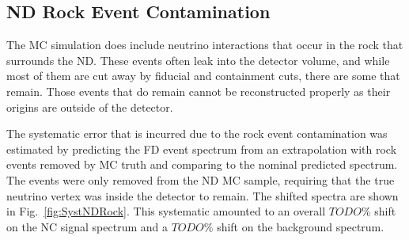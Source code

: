\subsection{ND Rock Event Contamination}

The MC simulation does include neutrino interactions that occur in the rock that surrounds the ND. These events often leak into the detector volume, and while most of them are cut away by fiducial and containment cuts, there are some that remain. Those events that do remain cannot be reconstructed properly as their origins are outside of the detector. 

The systematic error that is incurred due to the rock event contamination was estimated by predicting the FD event spectrum from an extrapolation with rock events removed by MC truth and comparing to the nominal predicted spectrum. The events were only removed from the ND MC sample, requiring that the true neutrino vertex was inside the detector to remain. The shifted spectra are shown in Fig.~\ref{fig:SystNDRock}. This systematic amounted to an overall $TODO\%$ shift on the NC signal spectrum and a $TODO\%$ shift on the background spectrum.

